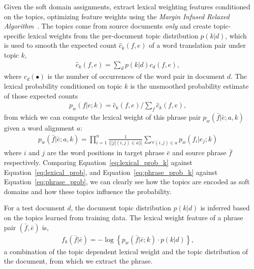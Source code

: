 Given the soft domain assignments, \citet{Eidelman-12} extract lexical weighting features conditioned on the topics, optimizing feature weights using the \emph{Margin Infused Relaxed Algorithm}~\cite[\textsc{mira}]{Crammer:2006}.  The topics come from source documents \emph{only} and create topic-specific lexical weights from the per-document topic distribution $p(k|d)$, which is used to smooth the expected count $\hat{c}_{k}(f,e)$ of a word translation pair under topic $k$,
\begin{align}
\textstyle \hat{c}_{k}(f,e) = \sum_{d}{p(k|d)c_d(f,e)},
\end{align}
where $c_d(\bullet)$ is the number of occurrences of the word pair in document $d$.  The lexical probability conditioned on topic $k$ is the unsmoothed probability estimate of those expected counts
\begin{align}
\label{eq:lexical_prob_k}
\textstyle p_w(f|e;k) = \hat{c}_{k}(f,e) / \sum_f{\hat{c}_{k}(f,e)},
\end{align}
from which we can compute the lexical weight of this phrase pair
$p_w(\bar{f}|\bar{e};a, k)$ given a word alignment $a$\citep{koehn-03}:
\begin{align}
\label{eq:phrase_prob_k}
p_w(\bar{f} | \bar{e};a, k) = \prod^{n}_{i=1} \frac{1}{\{|j | (i, j) \in a\}|} \sum_{\forall (i,j) \in a} p_w(f_i | e_j; k)
\end{align}
where $i$ and $j$ are the word positions in target phrase $\bar{e}$ and source phrase $\bar{f}$ respectively. Comparing Equation~\ref{eq:lexical_prob_k} against Equation~\ref{eq:lexical_prob}, and Equation~\ref{eq:phrase_prob_k} against Equation~\ref{eq:phrase_prob}, we can clearly see how the topics are encoded as soft domains and how these topics influence the probability. 

For a test document $d$, the document topic distribution $p(k | d)$ is inferred based on the topics learned from training data. The lexical weight feature of a phrase pair $(\bar{f}, \bar{e})$ is,
\begin{align}
\textstyle f_{k}(\bar{f}|\bar{e})=-\log\left\{{p_{w}(\bar{f}|\bar{e};k)\cdot p(k|d)}\right\},
\end{align}
a combination of the topic dependent lexical weight and the topic distribution of the document, from which we extract the phrase.

